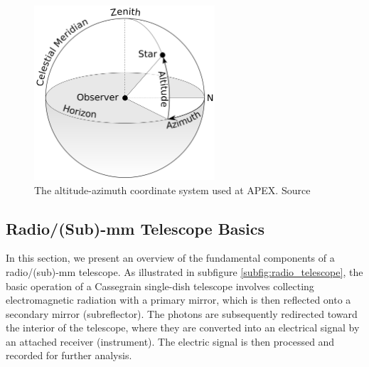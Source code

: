 


\begin{figure}[H]
    \centering
    \includegraphics[width=0.6\textwidth]{Astronomy/Azimuth-Altitude_schematic.png}
    \caption[Altitude-azimuth coordinate system]{The altitude-azimuth coordinate system used at APEX. Source \cite{altazschematic}}
    \label{fig:altaz_coords}
\end{figure}




\subsection{Radio/(Sub)-mm Telescope Basics}
In this section, we present an overview of the fundamental components of a radio/(sub)-mm telescope.
As illustrated in subfigure \ref{subfig:radio_telescope}, the basic operation of a Cassegrain single-dish telescope involves collecting electromagnetic radiation with a primary mirror, which is then reflected onto a secondary mirror (subreflector).
The photons are subsequently redirected toward the interior of the telescope, where they are converted into an electrical signal by an attached receiver (instrument).
The electric signal is then processed and recorded for further analysis.

